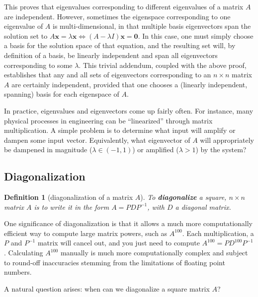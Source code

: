 \documentclass[draft,12pt]{report}
\newtheorem{definition}{Definition}
\renewcommand{\vec}[1]{\mathbf{#1}}
\begin{document}
This proves that eigenvalues corresponding to different eigenvalues of a matrix $A$ are independent. However, sometimes the eigenspace corresponding to one eigenvalue of $A$ is multi-dimensional, in that multiple basis eigenvectors span the solution set to $A\vec{x} = \lambda \vec{x} \iff (A - \lambda I)\vec{x} = \vec{0}$. In this case, one must simply choose a basis for the solution space of that equation, and the resulting set will, by definition of a basis, be linearly independent and span all eigenvectors corresponding to some $\lambda$. This trivial addendum, coupled with the above proof, establishes that any and all sets of eigenvectors corresponding to an $n \times n$ matrix $A$ are certainly independent, provided that one chooses a (linearly independent, spanning) basis for each eigenspace of $A$.

In practice, eigenvalues and eigenvectors come up fairly often. For instance, many physical processes in engineering can be ``linearized'' through matrix multiplication. A simple problem is to determine what input will amplify or dampen some input vector. Equivalently, what eigenvector of $A$ will appropriately be dampened in magnitude ($\lambda \in (-1, 1)$) or amplified ($\lambda > 1$) by the system?

\subsection{Diagonalization}

\begin{definition}[diagonalization of a matrix $A$]
    To \textbf{diagonalize} a square, $n \times n$ matrix $A$ is to write it in the form $A = PDP^{-1}$, with $D$ a diagonal matrix.
\end{definition}
\noindent
One significance of diagonalization is that it allows a much more computationally efficient way to compute large matrix powers, such as $A^{100}$. Each multiplication, a $P$ and $P^{-1}$ matrix will cancel out, and you just need to compute $A^{100} = PD^{100}P^{-1}$. Calculating $A^{100}$ manually is much more computationally complex and subject to round-off inaccuracies stemming from the limitations of floating point numbers.

A natural question arises: when can we diagonalize a square matrix $A$?
\end{document}
